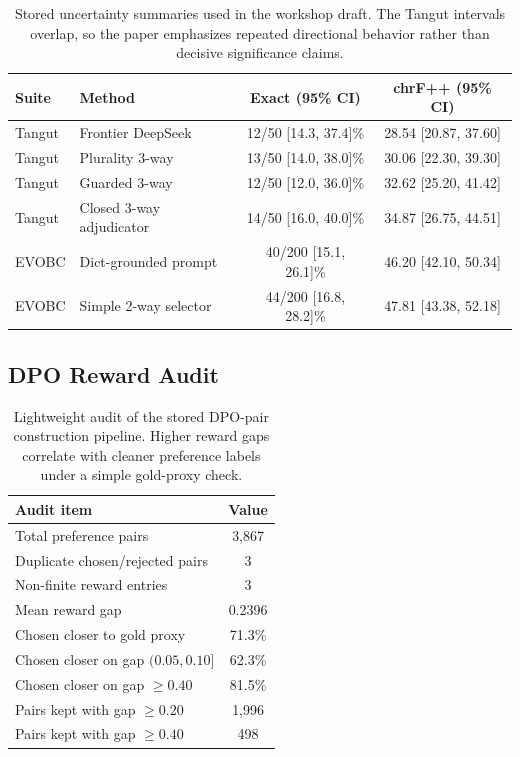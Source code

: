 \documentclass{article}
\begin{document}
\begin{table}[H]
\centering
\small
\begin{tabular}{llcc}
\toprule
Suite & Method & Exact (95\% CI) & chrF++ (95\% CI) \\
\midrule
Tangut & Frontier DeepSeek & 12/50 [14.3, 37.4]\% & 28.54 [20.87, 37.60] \\
Tangut & Plurality 3-way & 13/50 [14.0, 38.0]\% & 30.06 [22.30, 39.30] \\
Tangut & Guarded 3-way & 12/50 [12.0, 36.0]\% & 32.62 [25.20, 41.42] \\
Tangut & Closed 3-way adjudicator & 14/50 [16.0, 40.0]\% & 34.87 [26.75, 44.51] \\
\midrule
EVOBC & Dict-grounded prompt & 40/200 [15.1, 26.1]\% & 46.20 [42.10, 50.34] \\
EVOBC & Simple 2-way selector & 44/200 [16.8, 28.2]\% & 47.81 [43.38, 52.18] \\
\bottomrule
\end{tabular}
\caption{Stored uncertainty summaries used in the workshop draft. The Tangut intervals overlap, so the paper emphasizes repeated directional behavior rather than decisive significance claims.}
\label{tab:uncertainty}
\end{table}

\subsection{DPO Reward Audit}

\begin{table}[H]
\centering
\small
\begin{tabular}{lc}
\toprule
Audit item & Value \\
\midrule
Total preference pairs & 3,867 \\
Duplicate chosen/rejected pairs & 3 \\
Non-finite reward entries & 3 \\
Mean reward gap & 0.2396 \\
Chosen closer to gold proxy & 71.3\% \\
Chosen closer on gap $(0.05, 0.10]$ & 62.3\% \\
Chosen closer on gap $\geq 0.40$ & 81.5\% \\
Pairs kept with gap $\geq 0.20$ & 1,996 \\
Pairs kept with gap $\geq 0.40$ & 498 \\
\bottomrule
\end{tabular}
\caption{Lightweight audit of the stored DPO-pair construction pipeline. Higher reward gaps correlate with cleaner preference labels under a simple gold-proxy check.}
\label{tab:dpoaudit}
\end{table}
\end{document}
